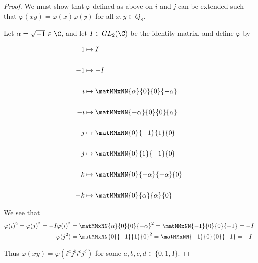 \begin{proof}
  We must show that $\varphi$ defined as above on $i$ and $j$ can be extended such
  that $\varphi(xy) = \varphi(x)\varphi(y)$ for all $x, y \in Q_8$.

  Let $\alpha = \sqrt{-1} \in \C$, and let $I \in GL_2(\C)$ be the identity matrix, and define $\varphi$ by

  \begin{align*}
    1 &\mapsto I \\
    ~\\
    -1 &\mapsto -I\\
    ~\\
    i &\mapsto \matMMxNN{\alpha}{0}
                  {0}{-\alpha} \\
    ~\\
    -i &\mapsto \matMMxNN{-\alpha}{0}
                   {0}{\alpha} \\
    ~\\
    j &\mapsto \matMMxNN{0}{-1}
                  {1}{0} \\
    ~\\
    -j &\mapsto \matMMxNN{0}{1}
                   {-1}{0} \\
    ~\\
    k &\mapsto \matMMxNN{0}{-\alpha}
                   {-\alpha}{0} \\
    ~\\
    -k &\mapsto \matMMxNN{0}{\alpha}
                   {\alpha}{0}
  \end{align*}

  We see that
  \begin{align*}
    \varphi(i)^2 = \varphi(j)^2 = -I
    \varphi(i)^2 &= \matMMxNN{\alpha}{0}
                      {0}{-\alpha}^2 = \matMMxNN{-1}{0}
                                           {0}{-1} = -I \\
    \varphi(j^2) &= \matMMxNN{0}{-1}
                      {1}{0}^2 = \matMMxNN{-1}{0}
                                          {0}{-1} = -I \\
  \end{align*}



  Thus $\varphi(xy) = \varphi(i^aj^bi^cj^d)$ for some $a, b, c, d \in \{0, 1, 3\}$.




\end{proof}

